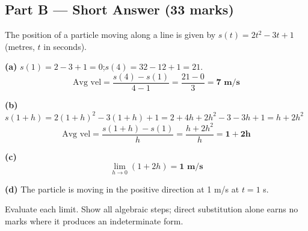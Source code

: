 \documentclass[addpoints]{exam}
\begin{document}
\begin{questions}
\section*{Part B --- Short Answer (33 marks)}

\question The position of a particle moving along a line is given by
$s(t) = 2t^2 - 3t + 1$ (metres, $t$ in seconds).
\begin{solution}[9cm]
\textbf{(a)} $s(1) = 2 - 3 + 1 = 0$;\quad $s(4) = 32 - 12 + 1 = 21$.
\[
\text{Avg vel} = \frac{s(4) - s(1)}{4 - 1} = \frac{21 - 0}{3} = \mathbf{7 \text{ m/s}}
\]

\textbf{(b)}
$s(1+h) = 2(1+h)^2 - 3(1+h) + 1 = 2 + 4h + 2h^2 - 3 - 3h + 1 = h + 2h^2$
\[
\text{Avg vel} = \frac{s(1+h) - s(1)}{h} = \frac{h + 2h^2}{h} = \mathbf{1 + 2h}
\]

\textbf{(c)}
\[
\lim_{h \to 0}(1 + 2h) = \mathbf{1 \text{ m/s}}
\]

\textbf{(d)} The particle is moving in the positive direction at 1 m/s at $t = 1$ s.
\end{solution}

\question Evaluate each limit. Show all algebraic steps; direct substitution alone earns no marks
where it produces an indeterminate form.
\end{questions}
\end{document}
